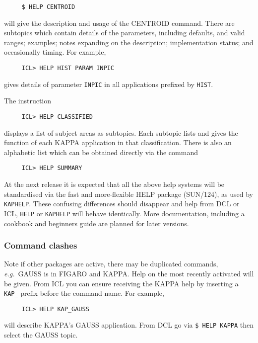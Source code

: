 \small
\begin{verbatim}
     $ HELP CENTROID
\end{verbatim}
\normalsize
will give the description and usage of the CENTROID command.  There
are subtopics which contain details of the parameters, including defaults, and
valid ranges; examples; notes expanding on the description;
implementation status; and occasionally timing.
For example,

\small
\begin{verbatim}
     ICL> HELP HIST PARAM INPIC
\end{verbatim}
\normalsize
gives details of parameter {\tt INPIC} in all applications prefixed by
{\tt HIST}.

The instruction

\small
\begin{verbatim}
     ICL> HELP CLASSIFIED
\end{verbatim}
\normalsize
displays a list of subject areas as subtopics.  Each subtopic lists and
gives the function of each {\small KAPPA} application in that classification.
There is also an alphabetic list which can be obtained directly via
the command

\small
\begin{verbatim}
     ICL> HELP SUMMARY
\end{verbatim}
\normalsize

At the next release it is expected that all the above help systems will
be standardised via the fast and more-flexible {\small HELP} package
(SUN/124), as used by {\tt KAPHELP}.  These confusing differences
should disappear and help from {\small DCL} or {\small ICL}, {\tt HELP}
or {\tt KAPHELP} will behave identically. More documentation, including a
cookbook and beginners guide are planned for later versions. 

\subsubsection{Command clashes}
Note if other packages are active, there may be duplicated commands,
{\it e.g.}\ GAUSS is in {\small FIGARO} and {\small KAPPA}.  Help on
the most recently activated will be given.  From {\small ICL} you can ensure
receiving the {\small KAPPA} help by inserting a {\tt KAP\_} prefix
before the command name.  For example,

\small
\begin{verbatim}
     ICL> HELP KAP_GAUSS
\end{verbatim}
\normalsize
will describe {\small KAPPA}'s GAUSS application.  From {\small DCL}
go via {\tt \$ HELP KAPPA} then select the GAUSS topic.


